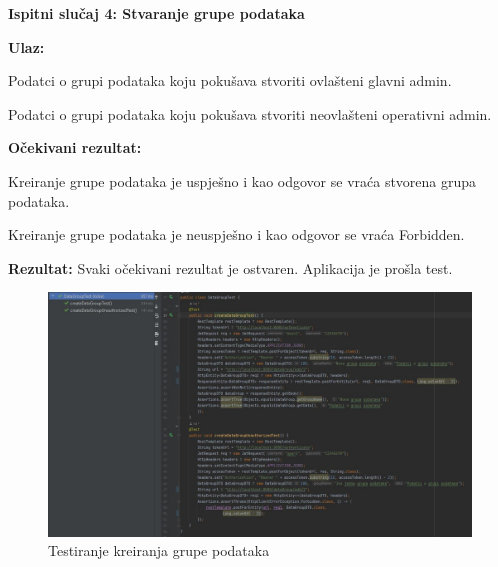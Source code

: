    
   			\textbf{Ispitni slučaj 4: Stvaranje grupe podataka \newline}
   
   \textbf{Ulaz:}
   \begin{packed_item}
   \item[] \begin{packed_enum}
				
				\item Podatci o grupi podataka koju pokušava stvoriti ovlašteni glavni admin.
    \item Podatci o grupi podataka koju pokušava stvoriti neovlašteni operativni admin.
				
			\end{packed_enum}
   \end{packed_item}

   \textbf{Očekivani rezultat:}
   \begin{packed_item}
   \item[] \begin{packed_enum}
				
				\item Kreiranje grupe podataka je uspješno i kao odgovor se vraća stvorena grupa podataka.
    \item  Kreiranje grupe podataka je neuspješno i kao odgovor se vraća Forbidden.
				
			\end{packed_enum}
   \end{packed_item}
   \textbf{Rezultat:} \text Svaki očekivani rezultat je ostvaren. \color{red} Aplikacija je prošla test. \color{black}

    \begin{figure}[H]
            \includegraphics[scale=0.55]{slike/DataGroupTest.JPG} %
			
			\centering
			\caption{Testiranje kreiranja grupe podataka}
			\label{fig:testiranje kreiranja grupe podataka}
			\end{figure}

